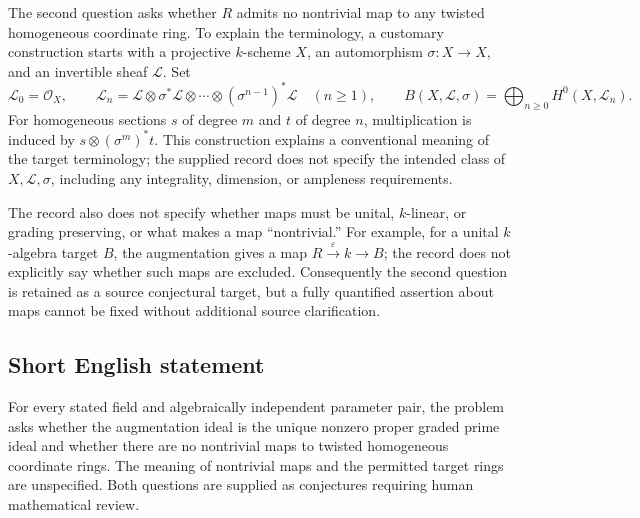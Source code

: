 \documentclass[11pt]{article}
\begin{document}
The second question asks whether \(R\) admits no nontrivial map to any twisted homogeneous coordinate ring. To explain the terminology, a customary construction starts with a projective \(k\)-scheme \(X\), an automorphism \(\sigma:X\to X\), and an invertible sheaf \(\mathcal L\). Set
\[
\mathcal L_0=\mathcal O_X,\qquad
\mathcal L_n=\mathcal L\otimes\sigma^*\mathcal L\otimes\cdots\otimes(\sigma^{n-1})^*\mathcal L\quad(n\ge1),
\qquad
B(X,\mathcal L,\sigma)=\bigoplus_{n\ge0}H^0(X,\mathcal L_n).
\]
For homogeneous sections \(s\) of degree \(m\) and \(t\) of degree \(n\), multiplication is induced by \(s\otimes(\sigma^m)^*t\). This construction explains a conventional meaning of the target terminology; the supplied record does not specify the intended class of \(X,\mathcal L,\sigma\), including any integrality, dimension, or ampleness requirements.

The record also does not specify whether maps must be unital, \(k\)-linear, or grading preserving, or what makes a map ``nontrivial.'' For example, for a unital \(k\)-algebra target \(B\), the augmentation gives a map \(R\xrightarrow{\varepsilon}k\to B\); the record does not explicitly say whether such maps are excluded. Consequently the second question is retained as a source conjectural target, but a fully quantified assertion about maps cannot be fixed without additional source clarification.
\subsection{Short English statement}
For every stated field and algebraically independent parameter pair, the problem asks whether the augmentation ideal is the unique nonzero proper graded prime ideal and whether there are no nontrivial maps to twisted homogeneous coordinate rings. The meaning of nontrivial maps and the permitted target rings are unspecified. Both questions are supplied as conjectures requiring human mathematical review.
\end{document}
